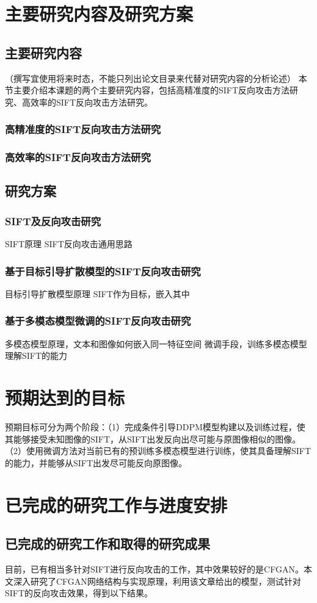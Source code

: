 \section{主要研究内容及研究方案}
\subsection{主要研究内容}
（撰写宜使用将来时态，不能只列出论文目录来代替对研究内容的分析论述）
本节主要介绍本课题的两个主要研究内容，包括高精准度的SIFT反向攻击方法研究、高效率的SIFT反向攻击方法研究。
\subsubsection{高精准度的SIFT反向攻击方法研究}
\subsubsection{高效率的SIFT反向攻击方法研究}
\subsection{研究方案}
\subsubsection{SIFT及反向攻击研究}
SIFT原理
SIFT反向攻击通用思路
\subsubsection{基于目标引导扩散模型的SIFT反向攻击研究}
目标引导扩散模型原理
SIFT作为目标，嵌入其中
\subsubsection{基于多模态模型微调的SIFT反向攻击研究}
多模态模型原理，文本和图像如何嵌入同一特征空间
微调手段，训练多模态模型理解SIFT的能力
\section{预期达到的目标}
预期目标可分为两个阶段：（1）完成条件引导DDPM模型构建以及训练过程，使其能够接受未知图像的SIFT，从SIFT出发反向出尽可能与原图像相似的图像。
（2）使用微调方法对当前已有的预训练多模态模型进行训练，使其具备理解SIFT的能力，并能够从SIFT出发尽可能反向原图像。
\section{已完成的研究工作与进度安排}
\subsection{已完成的研究工作和取得的研究成果}
目前，已有相当多针对SIFT进行反向攻击的工作，其中效果较好的是CFGAN。本文深入研究了CFGAN网络结构与实现原理，利用该文章给出的模型，测试针对SIFT的反向攻击效果，得到以下结果。
